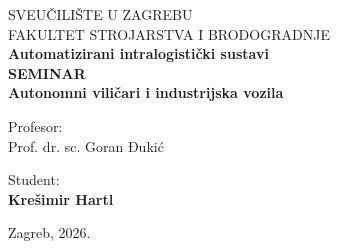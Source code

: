 \documentclass[12pt,a4paper]{article}
\begin{document}
\begin{titlepage}
    \thispagestyle{empty}
    \centering
    {\fontsize{16pt}{19pt}\selectfont SVEUČILIŠTE U ZAGREBU\\}
    {\fontsize{16pt}{19pt}\selectfont FAKULTET STROJARSTVA I BRODOGRADNJE\\}
    \vfill
    {\fontsize{28pt}{34pt}\selectfont\bfseries Automatizirani intralogistički sustavi\\}
    \vspace{0.5cm}
    {\fontsize{28pt}{34pt}\selectfont\bfseries SEMINAR\\}
    \vspace{1cm}
    {\fontsize{18pt}{22pt}\selectfont\bfseries Autonomni viličari i industrijska vozila\\}
    \vfill
    \noindent
    \begin{minipage}[t]{0.48\textwidth}
        \raggedright
        {\fontsize{14pt}{17pt}\selectfont Profesor:\\}
        {\fontsize{14pt}{17pt}\selectfont Prof. dr. sc. Goran Đukić\\}
    \end{minipage}
    \hfill
    \begin{minipage}[t]{0.48\textwidth}
        \raggedleft
        {\fontsize{14pt}{17pt}\selectfont Student:\\}
        {\fontsize{14pt}{17pt}\selectfont\bfseries Krešimir Hartl\\}
    \end{minipage}
    \vspace{1.5cm}
    \begin{center}
        {\fontsize{14pt}{17pt}\selectfont Zagreb, 2026.}
    \end{center}
\end{titlepage}


\tableofcontents
\newpage
\listoftables
\newpage


\end{document}
